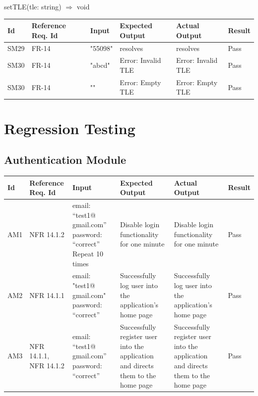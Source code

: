 \documentclass[12pt, titlepage]{article}
\begin{document}
setTLE(tle: string) $\Rightarrow$ void

\begin{center}
\begin{tabular}{|p{1cm} | p{2cm} |p{2cm}| p{2cm} |p{2cm}| p{2cm}|}
\hline
\textbf{Id} & \textbf{Reference Req. Id} & \textbf{Input} & \textbf{Expected Output} & \textbf{Actual Output} & \textbf{Result} \\
\hline
SM29 & FR-14 & { "55098" } & resolves
 & resolves & Pass
\\
\hline
SM30 & FR-14 & { "abcd" } & Error: Invalid TLE
 & Error: Invalid TLE & Pass
 \\
\hline
SM30 & FR-14 & { "" } & Error: Empty TLE
 & Error: Empty TLE & Pass
 \\
 \hline
\end{tabular}

\end{center}


\section{Regression Testing}

\subsection{Authentication Module}

\begin{center}
\begin{tabular}{|p{1cm} | p{2cm} |p{2cm}| p{2cm} |p{2cm}| p{2cm}|}
\hline
\textbf{Id} & \textbf{Reference Req. Id} & \textbf{Input} & \textbf{Expected Output} & \textbf{Actual Output} & \textbf{Result} \\
\hline
AM1 & NFR 14.1.2 & {email: “test1@ gmail.com”
password: “correct” } Repeat 10 times
 & Disable login functionality for one minute
 & Disable login functionality for one minute & Pass
\\
\hline
AM2 & NFR 14.1.1 & { email: "test1@ gmail.com"
password: “correct” }
 & Successfully log user into the application’s home page
 & Successfully log user into the application’s home page & Pass
\\
\hline
AM3 & NFR 14.1.1, NFR 14.1.2 & { email: “test1@ gmail.com”
password: “correct” }
 & Successfully register user into the application and directs them to the home page
 & Successfully register user into the application and directs them to the home page & Pass
\\
\hline

\end{tabular}

\end{center}
\end{document}
